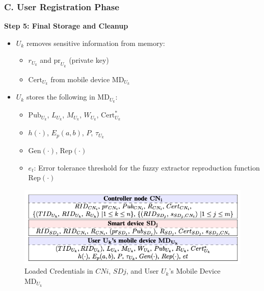 \documentclass[9pt,handout]{beamer}
\begin{document}
\begin{frame}
    \frametitle{C. User Registration Phase}

    \textbf{Step 5: Final Storage and Cleanup}
    
    \begin{itemize}
        \item \( U_k \) removes sensitive information from memory:
        \begin{itemize}
            \item \( r_{U_k} \) and \( \text{pr}_{U_k} \) (private key)
            \item \( \text{Cert}_{U_k} \) from mobile device \( \text{MD}_{U_k} \)
        \end{itemize}
        
        \item \( U_k \) stores the following in \( \text{MD}_{U_k} \):
        \begin{itemize}
            \item \( \text{Pub}_{U_k} \), \( L_{U_k} \), \( M_{U_k} \), \( W_{U_k} \), \( \text{Cert}^*_{U_k} \)
            \item \( h(\cdot) \), \( E_p(a, b) \), \( P \), \( \tau_{U_k} \)
            \item \( \text{Gen}(\cdot) \), \( \text{Rep}(\cdot) \)
            \item \( e_t \): Error tolerance threshold for the fuzzy extractor reproduction function \( \text{Rep}(\cdot) \)
        \end{itemize}
    \end{itemize}

    \vspace{0.3cm}
    
    \begin{figure}
        \centering
        \includegraphics[width=0.8\linewidth]{pre-loaded.png} %
        \caption{Loaded Credentials in \( CNi \), \( SDj \), and User \( U_k \)'s Mobile Device \( \text{MD}_{U_k} \)}
    \end{figure}

\end{frame}
\end{document}
